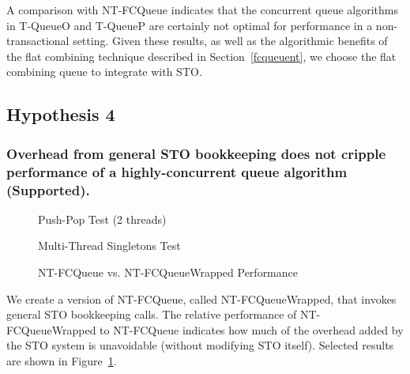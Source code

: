 A comparison with NT-FCQueue indicates that the concurrent queue algorithms in T-QueueO and T-QueueP are certainly not optimal for performance in a non-transactional setting.
Given these results, as well as the algorithmic benefits of the flat combining technique described in Section~\ref{fcqueuent}, we choose the flat combining queue to integrate with STO.

\vspace{12pt}
\noindent{}

\subsection{Hypothesis 4}
\subsubsection{Overhead from general STO bookkeeping does not cripple performance of a highly-concurrent queue algorithm (Supported).}

\begin{figure}[ht!]
    \centering
	\begin{minipage}{0.75\textwidth}
        \caption*{Push-Pop Test (2 threads)}
        \vspace{12pt}
	\end{minipage}
   	\begin{minipage}{0.75\textwidth}
        \caption*{Multi-Thread Singletons Test}
	\end{minipage}
        \caption{NT-FCQueue vs. NT-FCQueueWrapped Performance}
    \label{fig:wrappedqs}
\end{figure}

We create a version of NT-FCQueue, called NT-FCQueueWrapped, that invokes general STO bookkeeping calls. The relative performance of NT-FCQueueWrapped to NT-FCQueue indicates how much of the overhead added by the STO system is unavoidable (without modifying STO itself). 
Selected results are shown in Figure~\ref{fig:wrappedqs}.

